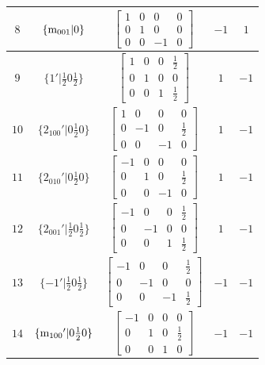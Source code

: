\documentclass[fleqn,8pt]{jsarticle}
\begin{document}
\begin{longtable}{ccccc}
$ 8 $ & $ \{{\rm m}_{001}|0\} $ & $ \begin{bmatrix} 1 & 0 & 0 & 0 \\ 0 & 1 & 0 & 0 \\ 0 & 0 & -1 & 0 \end{bmatrix} $ & $ -1 $ & $ 1 $ \\ \hline
$ 9 $ & $ \{1{}'|\frac{1}{2} 0 \frac{1}{2}\} $ & $ \begin{bmatrix} 1 & 0 & 0 & \frac{1}{2} \\ 0 & 1 & 0 & 0 \\ 0 & 0 & 1 & \frac{1}{2} \end{bmatrix} $ & $ 1 $ & $ -1 $ \\ \hline
$ 10 $ & $ \{2{}_{100}{}'|0 \frac{1}{2} 0\} $ & $ \begin{bmatrix} 1 & 0 & 0 & 0 \\ 0 & -1 & 0 & \frac{1}{2} \\ 0 & 0 & -1 & 0 \end{bmatrix} $ & $ 1 $ & $ -1 $ \\ \hline
$ 11 $ & $ \{2{}_{010}{}'|0 \frac{1}{2} 0\} $ & $ \begin{bmatrix} -1 & 0 & 0 & 0 \\ 0 & 1 & 0 & \frac{1}{2} \\ 0 & 0 & -1 & 0 \end{bmatrix} $ & $ 1 $ & $ -1 $ \\ \hline
$ 12 $ & $ \{2{}_{001}{}'|\frac{1}{2} 0 \frac{1}{2}\} $ & $ \begin{bmatrix} -1 & 0 & 0 & \frac{1}{2} \\ 0 & -1 & 0 & 0 \\ 0 & 0 & 1 & \frac{1}{2} \end{bmatrix} $ & $ 1 $ & $ -1 $ \\ \hline
$ 13 $ & $ \{-1{}'|\frac{1}{2} 0 \frac{1}{2}\} $ & $ \begin{bmatrix} -1 & 0 & 0 & \frac{1}{2} \\ 0 & -1 & 0 & 0 \\ 0 & 0 & -1 & \frac{1}{2} \end{bmatrix} $ & $ -1 $ & $ -1 $ \\ \hline
$ 14 $ & $ \{{\rm m}_{100}{}'|0 \frac{1}{2} 0\} $ & $ \begin{bmatrix} -1 & 0 & 0 & 0 \\ 0 & 1 & 0 & \frac{1}{2} \\ 0 & 0 & 1 & 0 \end{bmatrix} $ & $ -1 $ & $ -1 $ \\ \hline

\end{longtable}
\end{document}

